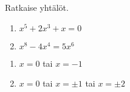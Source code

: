 \begin{tehtava}
    Ratkaise yhtälöt.
    \begin{enumerate}
        \item $x^5 + 2x^3 + x = 0$
        \item $x^8 - 4x^4 = 5x^6$       
    \end{enumerate}
    \begin{vastaus}
        \begin{enumerate}
        	\item $x = 0$ tai $x = -1$
        	\item $x = 0$ tai $x = \pm1$ tai $x = \pm2$
        \end{enumerate}
    \end{vastaus}
\end{tehtava}